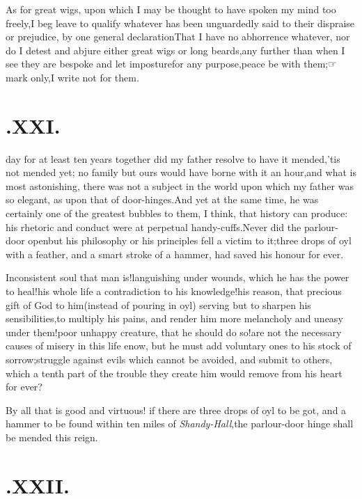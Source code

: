\documentclass{article}
\begin{document}
As for great wigs, upon which I may be thought to have spoken my
mind too freely,\tsh I beg leave to qualify whatever has
been unguardedly said to their dispraise or prejudice, by one
general declaration\tsk That I have no abhorrence whatever,
nor do I detest and abjure either great wigs or long beards,\tsk any
further than when I see they are bespoke and let  imposture\tsk for any
purpose,\tsk peace be with them;\tsk ☞ mark
only,\tsk I write not for them.

\section{.\quad  XXI.}

 day for at least ten years together did my
father resolve to have it mended,\tsh ’tis not mended yet;\tsh\break
no family but ours would have borne with it an hour,\tsk and
what is most asto\-nishing, there was not a subject in the world
upon which my father was so elegant\sic, as upon that of
door-hinges.\tsh\break And yet at the same time, he was certainly one
of the greatest bubbles to them, I think, that history can
produce: his rhe\-toric and conduct were at perpetual
handy-cuffs.\tsk Never did the parlour-door open\tsk but his
philosophy or his principles fell a victim to it;\tsh three
drops of oyl with a feather, and a smart stroke of a hammer, had
saved his honour for ever.

\tsh Inconsistent soul that man is!\tsh languishing under
wounds, which he has the power to heal!\tsk his whole life a
contradiction to his knowledge!\tsk his reason, that precious
gift of God to him\tsk (instead of pouring in oyl) serving but
to sharpen his sensibilities,\tsk to multiply his pains, and
render him more melancholy and uneasy under them!\tsk poor
unhappy creature, that he should do so!\tsh are not the
necessary causes of misery in this life enow, but he must add
voluntary ones to his stock of sorrow;\tsk struggle against
evils which cannot be avoided, and submit to others, which a
tenth part of the trouble they create him would remove from his
heart for ever?

By all that is good and virtuous! if there are three drops of
oyl to be got, and a hammer to be found within ten miles of
\textit{Shandy-Hall},\tsk the parlour-door hinge shall be
mended this reign.

\section{.\quad  XXII.}
\end{document}
